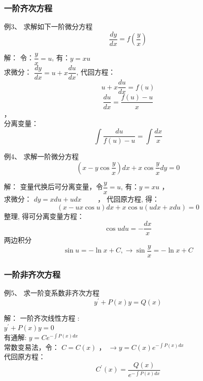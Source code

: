 \begin{frame}
	\frametitle{一阶齐次方程 }
	\begin{exampleblock} {例3、	求解如下一阶微分方程}
	\begin{equation*}
		\frac{d y}{d x}=f\left(\frac{y}{x}\right) 
	\end{equation*}
	\end{exampleblock} 	
	\alert{解：} 令：$\dfrac{y}{x}=u$, 有：$y=xu$ \\ 
	求微分： $ \dfrac{d y}{d x}=u+x \dfrac{d u}{d x}$,	代回方程：\\	
	 \[ u+x \dfrac{d u}{d x}=f(u)\]  \[ \dfrac{d u}{d x}=\dfrac{f(u)-u}{x}\] ，\\ \vspace{0.2cm}
	分离变量：
	\[\int \dfrac{d u}{f(u)-u}=\int \dfrac{d x}{x}\] 		
\end{frame}

\begin{frame}
\begin{exampleblock} {例4、	求解一阶微分方程}
	\begin{equation*}
	\left(x-y \cos \frac{y}{x}\right) d x+x \cos \frac{y}{x} d y=0
	\end{equation*}
\end{exampleblock} 	
\alert{解：} 变量代换后可分离变量，令$\dfrac{y}{x}=u$, 有：$y=xu$ ， \\ 
		求微分：	$d y=x d u+u d x$ ~~~~， 
		代回原方程, 得：
		\begin{equation*}
			(x-u x \cos u) d x+x \cos u(u d x+x d u)=0
		\end{equation*}	
		整理, 得可分离变量方程：
		\begin{equation*}
			\cos udu=-\frac{dx}{x}
		\end{equation*}	
		两边积分
		\begin{equation*}
			\sin u=-\ln x+C, \to  \sin \frac{y}{x}=-\ln x+C
		\end{equation*}	
\end{frame}


\begin{frame}
	\frametitle{一阶非齐次方程}
	\begin{exampleblock} {例5、	求一阶变系数非齐次方程}
	\begin{equation*}
		y^{\prime}+P(x) y=Q(x)
	\end{equation*}
	\end{exampleblock} 
	\alert{解：} 一阶齐次线性方程 :\\
		$ y^{\prime}+P(x) y=0$  \\ 
		有通解:	{\large 	$y=Ce^{-\int P(x)dx}$}\\	\vspace{0.3cm}
		常数变易法，令： $C=C(x)$ ，	{\large 	$ \to y=C(x)e^{-\int P(x)dx}$} \\ 
		代回原方程：
		\begin{equation*}
			C^{\prime}(x)=\frac {Q(x)} {e^{-\int P(x)dx}}
		\end{equation*}	
\end{frame}

